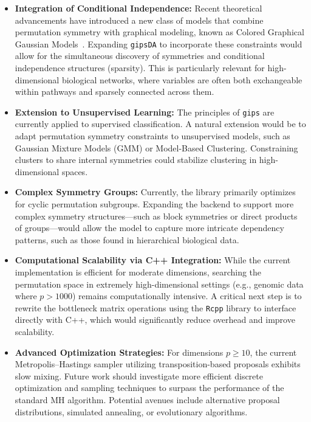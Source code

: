 \documentclass[a4paper,11pt,twoside]{report}
\theoremstyle{definition}
\begin{document}
\begin{itemize}
    \item \textbf{Integration of Conditional Independence:} Recent theoretical advancements have introduced a new class of models that combine permutation symmetry with graphical modeling, known as Colored Graphical Gaussian Models~\cite{chojecki2026newclasscoloredgaussian}. Expanding \texttt{gipsDA} to incorporate these constraints would allow for the simultaneous discovery of symmetries and conditional independence structures (sparsity). This is particularly relevant for high-dimensional biological networks, where variables are often both exchangeable within pathways and sparsely connected across them.

    \item \textbf{Extension to Unsupervised Learning:} The principles of \texttt{gips} are currently applied to supervised classification. A natural extension would be to adapt permutation symmetry constraints to unsupervised models, such as Gaussian Mixture Models (GMM) or Model-Based Clustering. Constraining clusters to share internal symmetries could stabilize clustering in high-dimensional spaces.

    \item \textbf{Complex Symmetry Groups:} Currently, the library primarily optimizes for cyclic permutation subgroups. Expanding the backend to support more complex symmetry structures—such as block symmetries or direct products of groups—would allow the model to capture more intricate dependency patterns, such as those found in hierarchical biological data.

    \item \textbf{Computational Scalability via C++ Integration:} While the current implementation is efficient for moderate dimensions, searching the permutation space in extremely high-dimensional settings (e.g., genomic data where $p > 1000$) remains computationally intensive. A critical next step is to rewrite the bottleneck matrix operations using the \texttt{Rcpp} library to interface directly with C++, which would significantly reduce overhead and improve scalability.

    \item \textbf{Advanced Optimization Strategies:} For dimensions $p \ge 10$, the current Metropolis–Hastings sampler utilizing transposition-based proposals exhibits slow mixing. Future work should investigate more efficient discrete optimization and sampling techniques to surpass the performance of the standard MH algorithm. Potential avenues include alternative proposal distributions, simulated annealing, or evolutionary algorithms.
\end{itemize}
\end{document}
